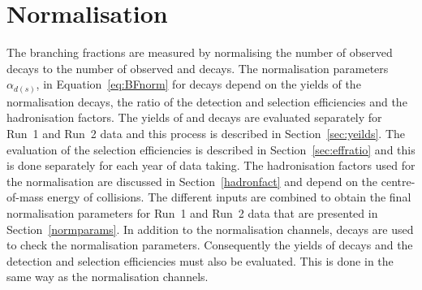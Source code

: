 {%
\section{Normalisation}
\label{sec:Normalisation}

The \bmumu branching fractions are measured by normalising the number of observed \bmumu decays to the number of observed \bujpsik and \bdkpi decays. 
The normalisation parameters $\alpha_{d(s)}$, in Equation~\ref{eq:BFnorm} for \bmumu decays depend on the yields of the normalisation decays, the ratio of the detection and selection efficiencies and the hadronisation factors. 
The yields of \bujpsik and \bdkpi decays are evaluated separately for Run~1 and Run~2 data and this process is described in Section~\ref{sec:yeilds}. 
The evaluation of the selection efficiencies is described in Section~\ref{sec:effratio} and this is done separately for each year of data taking.
The hadronisation factors used for the normalisation are discussed in Section~\ref{hadronfact} and depend on the centre-of-mass energy of collisions.
The different inputs are combined to obtain the final normalisation parameters for Run~1 and Run~2 data that are presented in Section~\ref{normparams}.
In addition to the normalisation channels, \bsjpsiphi decays are used to check the normalisation parameters. Consequently the yields of \bsjpisphi decays and the detection and selection efficiencies must also be evaluated. This is done in the same way as the normalisation channels.



}
